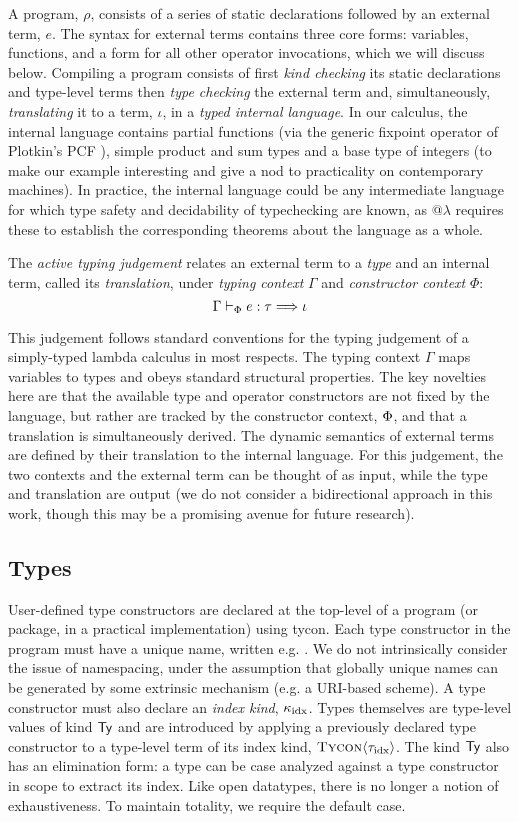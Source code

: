 A program, $\rho$, consists of a series of static declarations followed by an external term, $e$. The syntax for external terms contains three core forms: variables, functions, and a form for all other operator invocations, which we will discuss below. Compiling a program consists of first \emph{kind checking} its static declarations and type-level terms then \emph{type checking} the external term and, simultaneously, \emph{translating} it to a term, $\iota$, in a \emph{typed internal language}. In our calculus, the internal language contains partial functions (via the generic fixpoint operator of Plotkin's PCF \cite{PCF}), simple product and sum types and a base type of integers (to make our example interesting and give a nod to practicality on contemporary machines). In practice, the internal language could be any intermediate language for which type safety and decidability of typechecking are known, as @$\lambda$ requires these to establish the corresponding theorems about the language as a whole.

The \emph{active typing judgement} relates an external term to a \emph{type} and an internal term, called its \emph{translation}, under \emph{typing context} $\Gamma$ and \emph{constructor context} $\Phi$: 
$$\Gamma \vdash_{\Phi} e : \tau \Longrightarrow \iota$$ 

This judgement follows standard conventions for the typing judgement of a simply-typed lambda calculus in most respects. The typing context $\Gamma$ maps variables to types and obeys standard structural properties. The key novelties here are that the available type and operator constructors are not fixed by the language, but rather are tracked by the constructor context, $\Phi$, and that a translation is simultaneously derived. The dynamic semantics of external terms are defined by their translation to the internal language. For this judgement, the two contexts and the external term can be thought of as input, while the type and translation are output (we do not consider a bidirectional approach in this work, though this may be a promising avenue for future research).

\subsection{Types}
User-defined type constructors are declared at the top-level of a program (or package, in a practical implementation) using \textsf{tycon}. Each type constructor in the program must have a unique name, written e.g. . We do not intrinsically consider the issue of namespacing, under the assumption that globally unique names can be generated by some extrinsic mechanism (e.g. a URI-based scheme). A type constructor must also declare an \emph{index kind}, $\kappa_{\text{idx}}$. Types themselves are type-level values of kind $\textsf{Ty}$ and are introduced by applying a previously declared type constructor to a type-level term of its index kind, $\textsc{Tycon}\langle{\tau_{\text{idx}}}\rangle$. The kind $\textsf{Ty}$ also has an elimination form: a type can be case analyzed against a type constructor in scope to extract its index. Like open datatypes, there is no longer a notion of exhaustiveness. To maintain totality, we require the default case.


